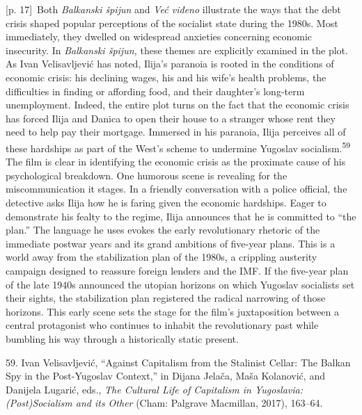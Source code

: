 \documentclass[10pt,a4paper]{article}
\begin{document}
{\scriptsize\color{gray} [p. 17]}\ Both \textit{Balkanski špijun} and \textit{Već viđeno} illustrate the ways that the debt crisis shaped popular perceptions of the socialist state during the 1980s. Most immediately, they dwelled on widespread anxieties concerning economic insecurity. In \textit{Balkanski špijun,} these themes are explicitly examined in the plot. As Ivan Velisavljević has noted, Ilija’s paranoia is rooted in the conditions of economic crisis: his declining wages, his and his wife’s health problems, the difficulties in finding or affording food, and their daughter’s long-term unemployment. Indeed, the entire plot turns on the fact that the economic crisis has forced Ilija and Danica to open their house to a stranger whose rent they need to help pay their mortgage. Immersed in his paranoia, Ilija perceives all of these hardships as part of the West’s scheme to undermine Yugoslav socialism.\nobreak\textsuperscript{59} The film is clear in identifying the economic crisis as the proximate cause of his psychological breakdown. One humorous scene is revealing for the miscommunication it stages. In a friendly conversation with a police official, the detective asks Ilija how he is faring given the economic hardships. Eager to demonstrate his fealty to the regime, Ilija announces that he is committed to “the plan.” The language he uses evokes the early revolutionary rhetoric of the immediate postwar years and its grand ambitions of five-year plans. This is a world away from the stabilization plan of the 1980s, a crippling austerity campaign designed to reassure foreign lenders and the IMF. If the five-year plan of the late 1940s announced the utopian horizons on which Yugoslav socialists set their sights, the stabilization plan registered the radical narrowing of those horizons. This early scene sets the stage for the film’s juxtaposition between a central protagonist who continues to inhabit the revolutionary past while bumbling his way through a historically static present.\par{\small 59. Ivan Velisavljević, “Against Capitalism from the Stalinist Cellar: The Balkan Spy in the Post-Yugoslav Context,” in Dijana Jelača, Maša Kolanović, and Danijela Lugarić, eds., \textit{The Cultural Life of Capitalism in Yugoslavia: (Post)Socialism and its Other} (Cham: Palgrave Macmillan, 2017), 163–64.\par}
\end{document}

